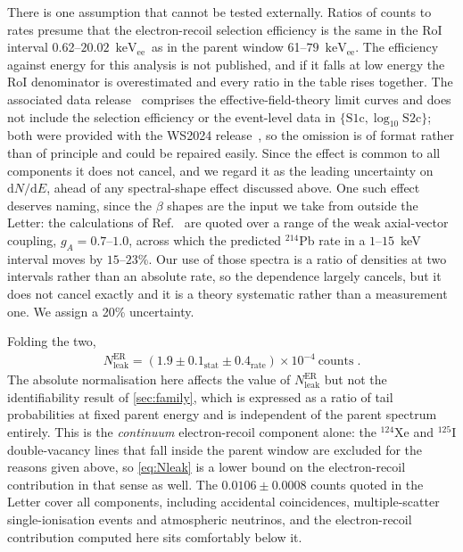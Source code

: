 \documentclass[11pt,a4paper]{article}
\newcommand{\keVee}{\ensuremath{\mathrm{keV_{ee}}}}
\begin{document}
There is one assumption that cannot be tested externally. Ratios of counts to rates
presume that the electron-recoil selection efficiency is the same in the
RoI interval 0.62--\(20.02\)~\keVee\ as in the parent window
61--\(79\)~\keVee. The efficiency against energy for this analysis is
not published, and if it falls at low energy the RoI denominator is
overestimated and every ratio in the table rises together. The
associated data release~\cite{LZdata} comprises the
effective-field-theory limit curves and does not include the selection
efficiency or the event-level data in
\(\{\mathrm{S1c},\log_{10}\mathrm{S2c}\}\); both were provided with the
WS2024 release~\cite{WS2024}, so the omission is of format rather than
of principle and could be repaired easily. Since the effect is common to
all components it does not cancel, and we regard it as the leading
uncertainty on \(\mathrm{d}N/\mathrm{d}E\), ahead of any spectral-shape
effect discussed above. One such effect deserves naming, since the
\(\beta\) shapes are the input we take from outside the Letter: the
calculations of Ref.~\cite{BetaShapes} are quoted over a range of the
weak axial-vector coupling, \(g_A=0.7\)--\(1.0\), across which the
predicted \(^{214}\)Pb rate in a \(1\)--\(15\)~keV interval moves by
\(15\)--\(23\%\). Our use of those spectra is a ratio of densities at
two intervals rather than an absolute rate, so the dependence largely
cancels, but it does not cancel exactly and it is a theory systematic
rather than a measurement one. We assign a 20\% uncertainty.

Folding the two, 
\begin{align}
    \label{eq:Nleak}
    N^\mathrm{ER}_\mathrm{leak}=(1.9\pm0.1_\mathrm{stat}\pm0.4_\mathrm{rate})\times10^{-4}~\text{counts}\;.
\end{align}
The absolute normalisation here affects the value of
\(N^\mathrm{ER}_\mathrm{leak}\) but not the identifiability result of
\cref{sec:family}, which is expressed as a ratio of tail
probabilities at fixed parent energy and is independent of the parent
spectrum entirely. This is the \emph{continuum} electron-recoil component
alone: the \(^{124}\)Xe and \(^{125}\)I double-vacancy lines that fall
inside the parent window are excluded for the reasons given above, so
\cref{eq:Nleak} is a lower bound on the electron-recoil contribution in
that sense as well. The \(0.0106\pm0.0008\)
counts quoted in the Letter cover all components, including accidental
coincidences, multiple-scatter single-ionisation events and atmospheric
neutrinos, and the electron-recoil contribution computed here sits
comfortably below it.
\end{document}
